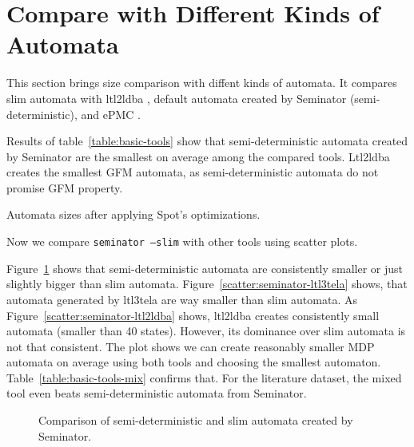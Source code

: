 \documentclass[
	digital,
nolof, nolot
]{fithesis3}
\begin{document}
	\clearpage
		\section{Compare with Different Kinds of Automata}
		This section brings size comparison with diffent kinds of automata. It compares slim automata with ltl2ldba \cite{ltl2ldba}, default automata created by Seminator (semi-deterministic), and ePMC \cite{epmc}.
		
		Results of table~\ref{table:basic-tools} show that semi-deterministic automata created by Seminator are the smallest on average among the compared tools. Ltl2ldba creates the smallest GFM automata, as semi-deterministic automata do not promise GFM property.
		
		\begin{table}[ht]
			\centering
			
			\caption{Automata sizes after applying Spot's optimizations.}
			\label{table:basic-tools}
			
		\end{table}
		
		
		
		Now we compare \texttt{seminator --slim} with other tools using scatter plots.
		
		Figure~\ref{scatter:seminator-slim-default} shows that semi-deterministic automata are consistently smaller or just slightly bigger than slim automata.
		Figure~\ref{scatter:seminator-ltl3tela} shows, that automata generated by ltl3tela are way smaller than slim automata.
		As Figure~\ref{scatter:seminator-ltl2ldba} shows, ltl2ldba creates consistently small automata (smaller than 40 states). However, its dominance over slim automata is not that consistent. The plot shows we can create reasonably smaller MDP automata on average using both tools and choosing the smallest automaton. Table~\ref{table:basic-tools-mix} confirms that. For the literature dataset, the mixed tool even beats semi-deterministic automata from Seminator.
		\begin{figure}[ht]
			\centering
			
			\caption{Comparison of semi-deterministic and slim automata created by Seminator.}
			\label{scatter:seminator-slim-default}
			\begin{tikzpicture}
				
			\end{tikzpicture}
		\end{figure}
		
\end{document}
